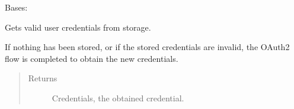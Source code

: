 \documentclass[letterpaper,10pt,english]{sphinxmanual}
\begin{document}
\begin{fulllineitems}
\label{rpicameramon:rpicameramon.telemetry.GoogleHandler}
Bases: 

\begin{fulllineitems}
\label{rpicameramon:rpicameramon.telemetry.GoogleHandler.add_sheet_line}
\end{fulllineitems}


\begin{fulllineitems}
\label{rpicameramon:rpicameramon.telemetry.GoogleHandler.get_credentials}
Gets valid user credentials from storage.

If nothing has been stored, or if the stored credentials are invalid,
the OAuth2 flow is completed to obtain the new credentials.
\begin{quote}\begin{description}
\item[{Returns}] \leavevmode
Credentials, the obtained credential.

\end{description}\end{quote}

\end{fulllineitems}


\begin{fulllineitems}
\label{rpicameramon:rpicameramon.telemetry.GoogleHandler.get_file_service}
\end{fulllineitems}


\begin{fulllineitems}
\label{rpicameramon:rpicameramon.telemetry.GoogleHandler.get_sheets_service}
\end{fulllineitems}


\begin{fulllineitems}
\label{rpicameramon:rpicameramon.telemetry.GoogleHandler.upload_file}
\end{fulllineitems}


\end{fulllineitems}
\end{document}
